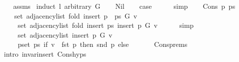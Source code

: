 \begin{isabellebody}
%
\isadelimproof
\ \ %
\endisadelimproof
%
\isatagproof
{}\isamarkupfalse%
\ assms\isanewline
{}\isamarkupfalse%
\ {\isacharparenleft}{\kern0pt}induct\ l\ arbitrary{\isacharcolon}{\kern0pt}\ G{\isacharparenright}{\kern0pt}\isanewline
\ \ \isamarkupfalse%
\ Nil\isanewline
\ \ \isamarkupfalse%
\ {\isacharquery}{\kern0pt}case\isanewline
\ \ \ \ \isamarkupfalse%
\ simp\isanewline
{}\isamarkupfalse%
\isanewline
\ \ \isamarkupfalse%
\ {\isacharparenleft}{\kern0pt}Cons\ p\ ps{\isacharparenright}{\kern0pt}\isanewline
\ \ \isamarkupfalse%
\isanewline
\ \ \ \ {\isachardoublequoteopen}set\ {\isacharparenleft}{\kern0pt}adjacency{\isacharunderscore}{\kern0pt}list\ {\isacharparenleft}{\kern0pt}fold\ insert\ {\isacharparenleft}{\kern0pt}p\ {\isacharhash}{\kern0pt}\ ps{\isacharparenright}{\kern0pt}\ G{\isacharparenright}{\kern0pt}\ v{\isacharparenright}{\kern0pt}\ {\isacharequal}{\kern0pt}\isanewline
\ \ \ \ \ set\ {\isacharparenleft}{\kern0pt}adjacency{\isacharunderscore}{\kern0pt}list\ {\isacharparenleft}{\kern0pt}fold\ insert\ ps\ {\isacharparenleft}{\kern0pt}insert\ p\ G{\isacharparenright}{\kern0pt}{\isacharparenright}{\kern0pt}\ v{\isacharparenright}{\kern0pt}{\isachardoublequoteclose}\isanewline
\ \ \ \ \isamarkupfalse%
\ simp\isanewline
\ \ \isamarkupfalse%
\ \isamarkupfalse%
\isanewline
\ \ \ \ {\isachardoublequoteopen}{\isachardot}{\kern0pt}{\isachardot}{\kern0pt}{\isachardot}{\kern0pt}\ {\isacharequal}{\kern0pt}\isanewline
\ \ \ \ \ set\ {\isacharparenleft}{\kern0pt}adjacency{\isacharunderscore}{\kern0pt}list\ {\isacharparenleft}{\kern0pt}insert\ p\ G{\isacharparenright}{\kern0pt}\ v{\isacharparenright}{\kern0pt}\ {\isasymunion}\isanewline
\ \ \ \ \ {\isacharparenleft}{\kern0pt}{\isasymUnion}p{\isasymin}set\ ps{\isachardot}{\kern0pt}\ if\ v\ {\isacharequal}{\kern0pt}\ fst\ p\ then\ {\isacharbraceleft}{\kern0pt}snd\ p{\isacharbraceright}{\kern0pt}\ else\ {\isacharbraceleft}{\kern0pt}{\isacharbraceright}{\kern0pt}{\isacharparenright}{\kern0pt}{\isachardoublequoteclose}\isanewline
\ \ \ \ \isamarkupfalse%
\ Cons{\isachardot}{\kern0pt}prems\isanewline
\ \ \ \ \isamarkupfalse%
\ {\isacharparenleft}{\kern0pt}intro\ invar{\isacharunderscore}{\kern0pt}insert\ Cons{\isachardot}{\kern0pt}hyps{\isacharparenright}{\kern0pt}\isanewline
\ \ \isamarkupfalse%
\ \isamarkupfalse%
\isanewline
\ \ \ \ {\isachardoublequoteopen}{\isachardot}{\kern0pt}{\isachardot}{\kern0pt}{\isachardot}{\kern0pt}\ {\isacharequal}{\kern0pt}\isanewline

\end{isabellebody}
